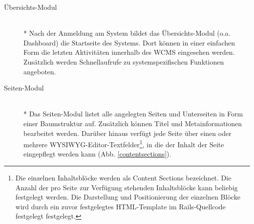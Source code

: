 \begin{description}
\item[Übersichts-Modul]\mbox{~}\\*
Nach der Anmeldung am System bildet das Übersichts-Modul (o.a. Dashboard) die Startseite des Systems. Dort können in einer einfachen Form die letzten Aktivitäten innerhalb des WCMS eingesehen werden. Zusätzlich werden Schnellaufrufe zu systemspezifischen Funktionen angeboten.
\item[Seiten-Modul]\mbox{~}\\*
Das Seiten-Modul listet alle angelegten Seiten und Unterseiten in Form einer Baumstruktur auf. Zusätzlich können Titel und Metainformationen bearbeitet werden. Darüber hinaus verfügt jede Seite über einen oder mehrere WYSIWYG-Editor-Textfelder\footnote{Die einzelnen Inhaltsblöcke werden als Content Sections bezeichnet. Die Anzahl der pro Seite zur Verfügung stehenden Inhaltsblöcke kann beliebig festgelegt werden. Die Darstellung  und Positionierung der einzelnen Blöcke wird durch ein zuvor festgelegtes HTML-Template im Rails-Quellcode festgelegt festgelegt.}, in die der Inhalt der Seite eingepflegt werden kann (Abb. \ref{contentsections}).


\end{description}
